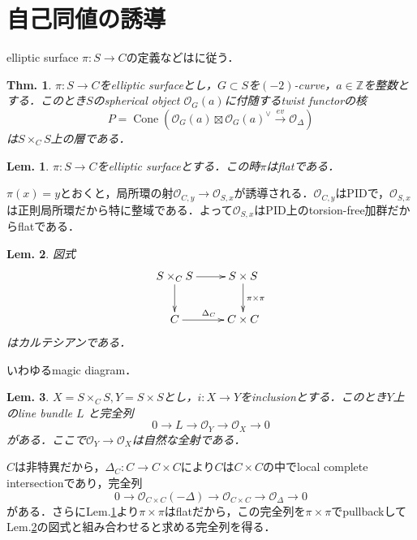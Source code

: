 \documentclass[uplatex,a4paper,11pt,dvipdfmx]{jsarticle}
\makeatletter
\theoremstyle{mystyle} %
\newtheorem{theorem}{Thm.}[section]
\newtheorem{lemma}{Lem.}[section]
\renewenvironment{proof}[1][\proofname]{\par
 \pushQED{\qed}%
 \normalfont \topsep6\p@\@plus6\p@\relax
 \trivlist
 \item[\hskip\labelsep
 \itshape
 {\bf\underline{#1}}]\ignorespaces
}{%
 \popQED\endtrivlist\@endpefalse
}
\DeclareMathOperator{\Cone}{Cone}
\makeatother
\begin{document}
\title{}
\author{}
\date{}
\section{自己同値の誘導}
elliptic surface $\pi \colon S \to C$の定義などは\cite{Ueh15}に従う．
\begin{theorem}
	$\pi \colon S \to C$をelliptic surfaceとし，$G \subset S$を$(-2)$-curve，$a \in \mathbb{Z}$を整数とする．このとき$S$のspherical object $\mathcal{O}_G(a)$に付随するtwist functorの核$$P = \Cone(\mathcal{O}_G(a) \boxtimes \mathcal{O}_G(a)^\vee \xrightarrow{ev} \mathcal{O}_\Delta)$$は$S\times_C S$上の層である．
\end{theorem}
\begin{lemma}\label{flatness}
	$\pi \colon S \to C$をelliptic surfaceとする．この時$\pi$はflatである．
\end{lemma}
\begin{proof}
	$\pi(x)=y$とおくと，局所環の射$\mathcal{O}_{C, y} \to \mathcal{O}_{S, x}$が誘導される．$\mathcal{O}_{C, y} $はPIDで，$\mathcal{O}_{S, x}$は正則局所環だから特に整域である．よって$\mathcal{O}_{S, x}$はPID上のtorsion-free加群だからflatである．
\end{proof}
\begin{lemma}\label{Cartesian}
	図式
	\[
		\xymatrix{
			S \times_C S \ar[r] \ar[d]& S \times S \ar[d]^{\pi \times \pi}\\
			C \ar[r]^{\Delta_C} & C \times C
		}
	\]
	はカルテシアンである．
\end{lemma}
\begin{proof}
	いわゆるmagic diagram．
\end{proof}
\begin{lemma}\label{effective_divisor}
	$X = S \times_C S, Y = S \times S$とし，$i \colon X \to Y$をinclusionとする．このとき$Y$上のline bundle $L$ と完全列$$0 \to L \to \mathcal{O}_Y \to \mathcal{O}_X \to 0$$がある．ここで$\mathcal{O}_Y \to \mathcal{O}_X$は自然な全射である．
\end{lemma}
\begin{proof}
	$C$は非特異だから，$\Delta_C\colon C \to C \times C$により$C$は$C\times C$の中でlocal complete intersectionであり，完全列$$0 \to \mathcal{O}_{C\times C}(-\Delta) \to \mathcal{O}_{C \times C} \to \mathcal{O}_{\Delta} \to 0$$がある．さらにLem.\ref{flatness}より$\pi \times \pi$はflatだから，この完全列を$\pi \times \pi$でpullbackしてLem.\ref{Cartesian}の図式と組み合わせると求める完全列を得る．
\end{proof}
\end{document}
